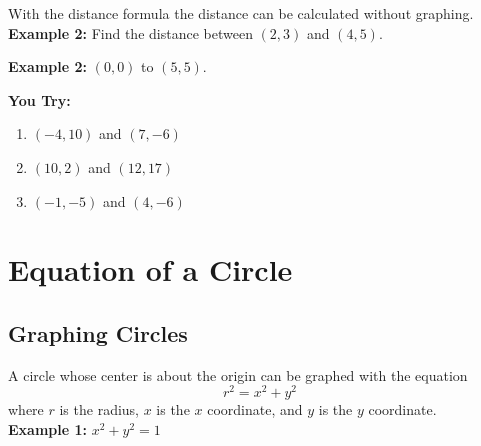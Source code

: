 \documentclass[12pt]{article}
\begin{document}
With the distance formula the distance can be calculated without graphing.\\

\textbf{Example 2:} Find the distance between $(2,3)$ and $(4,5)$.\\

\vspace{1cm}

\textbf{Example 2:} $(0,0)$ to $(5,5)$.\\

\vspace{1cm}

\textbf{You Try:}

\begin{enumerate}
	
	\item $(-4,10)$ and $(7,-6)$\\

	\item $(10,2)$ and $(12, 17)$\\

	\item $(-1,-5)$ and $(4,-6)$\\

\end{enumerate}


\section*{Equation of a Circle}

\subsection*{Graphing Circles}

A circle whose center is about the origin can be graphed with the equation $$r^2=x^2+y^2$$ where $r$ is the radius, $x$ is the $x$ coordinate, and $y$ is the $y$ coordinate. \\

\textbf{Example 1:} $x^2+y^2=1$

\begin{center}
\end{center}
\end{document}
